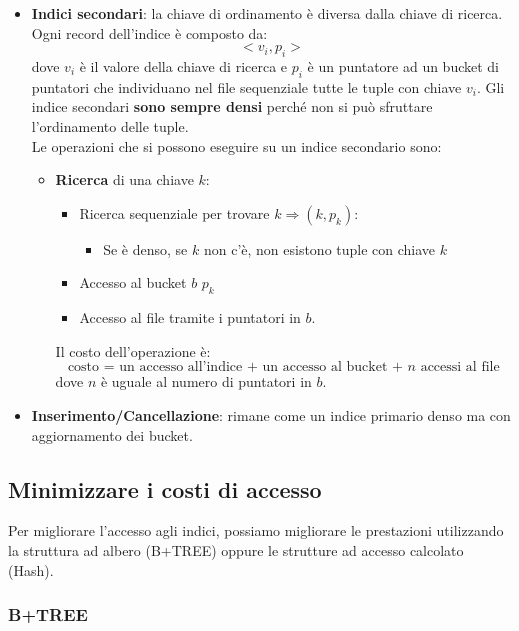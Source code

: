 \documentclass[a4paper]{article}
\begin{document}
\begin{itemize}
    \item \textbf{Indici secondari}: la chiave di ordinamento è diversa
    dalla chiave di ricerca.
    Ogni record dell'indice è composto da:
    \[
        < v_i, p_i >
    \]
dove $v_i$ è il valore della chiave di ricerca e $p_i$ è un puntatore ad un bucket
di puntatori che individuano nel file sequenziale tutte le tuple con chiave $v_i$.
Gli indice secondari \textbf{sono sempre densi} perché non si può sfruttare
l'ordinamento delle tuple. \\
Le operazioni che si possono eseguire su un indice secondario sono:
\begin{itemize}
    \item \textbf{Ricerca} di una chiave $k$:
    \begin{itemize}
        \item Ricerca sequenziale per trovare $k \Rightarrow (k, p_k)$:
        \begin{itemize}
            \item Se è denso, se $k$ non c'è, non esistono tuple con chiave $k$
        \end{itemize}
        \item Accesso al bucket $b$ $p_k$
        \item Accesso al file tramite i puntatori in $b$.
    \end{itemize}
    Il costo dell'operazione è:
    \[
        \text{costo = un accesso all'indice + un accesso al bucket + $n$ accessi al file}
    \]
    dove $n$ è uguale al numero di puntatori in $b$.
    \end{itemize}
    \item \textbf{Inserimento/Cancellazione}: rimane come un indice primario
    denso ma con aggiornamento dei bucket.
\end{itemize}

\subsection{Minimizzare i costi di accesso}

Per migliorare l'accesso agli indici, possiamo migliorare le prestazioni
utilizzando la struttura ad albero (B+TREE) oppure le strutture ad accesso
calcolato (Hash).

\subsubsection{B+TREE}
\end{document}
